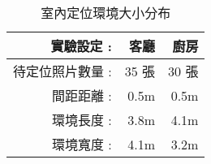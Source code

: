 \begin{table}[htbp]
  \centering
  \caption{室內定位環境大小分布}
    \begin{tabular}{rrr}
    \toprule
    實驗設定 :  & 客廳 & 廚房 \\
    \midrule
    待定位照片數量 : & 35 張  & 30 張 \\
    間距距離 : & 0.5m & 0.5m \\
    環境長度 : & 3.8m & 4.1m \\
    環境寬度 : & 4.1m & 3.2m \\
    \bottomrule
    \end{tabular}%
  \label{table:Indoor EV parameters}%
\end{table}%
